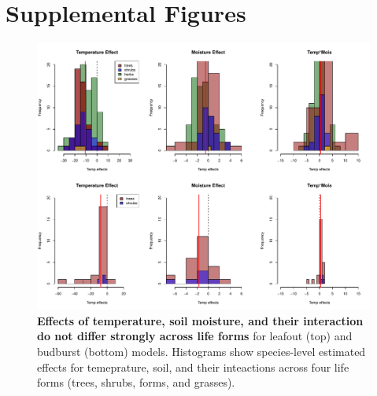 \documentclass{article}
\begin{document}
\section*{Supplemental Figures}

% 

% 
 
 \begin{figure}[h]
\centering
 \includegraphics{../../Analyses/soilmoisture/figures/histbbloform_spef.pdf}
 \caption{\textbf{Effects of temperature, soil moisture, and their interaction do not differ strongly across life forms} for leafout (top) and budburst (bottom) models. Histograms show species-level estimated effects for temeprature, soil, and their inteactions across four life forms (trees, shrubs, forms, and grasses).}
 \label{fig:forms}
 \end{figure}
\end{document}
